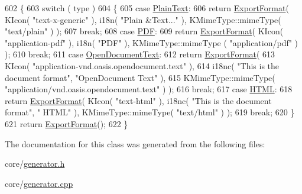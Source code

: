 \begin{DoxyCode}
602 \{
603     \textcolor{keywordflow}{switch} ( type )
604     \{
605         \textcolor{keywordflow}{case} \hyperlink{classOkular_1_1ExportFormat_af030ecc6c77b5cdd89cd1bc4a894c6f2ad7daf23a3915d800df9de1b417a4b65a}{PlainText}:
606             \textcolor{keywordflow}{return} \hyperlink{classOkular_1_1ExportFormat_a339e9c29dbe58bf680ac06ab727614de}{ExportFormat}( KIcon( \textcolor{stringliteral}{"text-x-generic"} ), i18n( \textcolor{stringliteral}{"Plain &Text..."} ), 
      KMimeType::mimeType( \textcolor{stringliteral}{"text/plain"} ) );
607             \textcolor{keywordflow}{break};
608         \textcolor{keywordflow}{case} \hyperlink{classOkular_1_1ExportFormat_af030ecc6c77b5cdd89cd1bc4a894c6f2a282bea2bc8da48d30988d1286571c671}{PDF}:
609             \textcolor{keywordflow}{return} \hyperlink{classOkular_1_1ExportFormat_a339e9c29dbe58bf680ac06ab727614de}{ExportFormat}( KIcon( \textcolor{stringliteral}{"application-pdf"} ), i18n( \textcolor{stringliteral}{"PDF"} ), KMimeType::mimeType
      ( \textcolor{stringliteral}{"application/pdf"} ) );
610             \textcolor{keywordflow}{break};
611         \textcolor{keywordflow}{case} \hyperlink{classOkular_1_1ExportFormat_af030ecc6c77b5cdd89cd1bc4a894c6f2a82b7e76dc44580c9742e6e41042892f3}{OpenDocumentText}:
612             \textcolor{keywordflow}{return} \hyperlink{classOkular_1_1ExportFormat_a339e9c29dbe58bf680ac06ab727614de}{ExportFormat}(
613                 KIcon( \textcolor{stringliteral}{"application-vnd.oasis.opendocument.text"} ),
614                 i18nc( \textcolor{stringliteral}{"This is the document format"}, \textcolor{stringliteral}{"OpenDocument Text"} ),
615                 KMimeType::mimeType( \textcolor{stringliteral}{"application/vnd.oasis.opendocument.text"} ) );
616         \textcolor{keywordflow}{break};
617         \textcolor{keywordflow}{case} \hyperlink{classOkular_1_1ExportFormat_af030ecc6c77b5cdd89cd1bc4a894c6f2a7d2fa80544cea061db29c01e973131c0}{HTML}:
618             \textcolor{keywordflow}{return} \hyperlink{classOkular_1_1ExportFormat_a339e9c29dbe58bf680ac06ab727614de}{ExportFormat}( KIcon( \textcolor{stringliteral}{"text-html"} ), i18nc( \textcolor{stringliteral}{"This is the document format"}, \textcolor{stringliteral}{"
      HTML"} ), KMimeType::mimeType( \textcolor{stringliteral}{"text/html"} ) );
619             \textcolor{keywordflow}{break};
620     \}
621     \textcolor{keywordflow}{return} \hyperlink{classOkular_1_1ExportFormat_a339e9c29dbe58bf680ac06ab727614de}{ExportFormat}();
622 \}
\end{DoxyCode}


The documentation for this class was generated from the following files\+:\begin{DoxyCompactItemize}
\item 
core/\hyperlink{generator_8h}{generator.\+h}\item 
core/\hyperlink{generator_8cpp}{generator.\+cpp}\end{DoxyCompactItemize}
